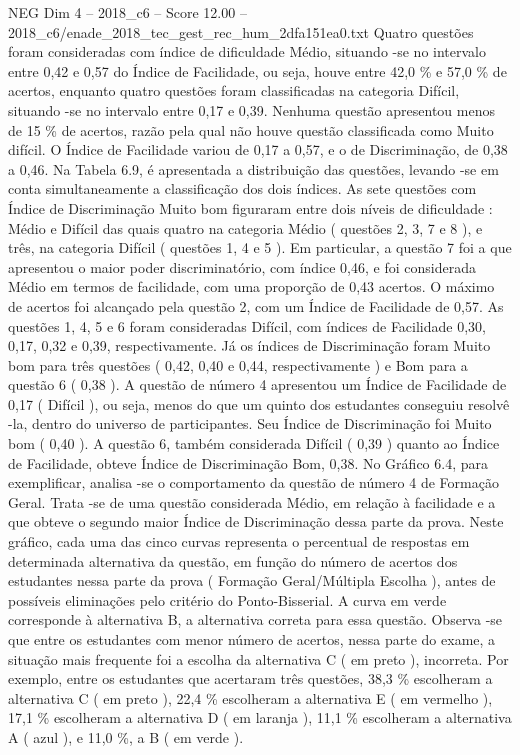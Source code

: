 \begin{textsample}{NEG Dim 4 – 2018\_c6 – Score 12.00 – 2018\_c6/enade\_2018\_tec\_gest\_rec\_hum\_2dfa151ea0.txt}
Quatro questões foram consideradas com índice de dificuldade Médio, situando -se no intervalo entre 0,42 e 0,57 do Índice de Facilidade, ou seja, houve entre 42,0 \% e 57,0 \% de acertos, enquanto quatro questões foram classificadas na categoria Difícil, situando -se no intervalo entre 0,17 e 0,39.
Nenhuma questão apresentou menos de 15 \% de acertos, razão pela qual não houve questão classificada como Muito difícil.
O Índice de Facilidade variou de 0,17 a 0,57, e o de Discriminação, de 0,38 a 0,46.
Na Tabela 6.9, é apresentada a distribuição das questões, levando -se em conta simultaneamente a classificação dos dois índices.
As sete questões com Índice de Discriminação Muito bom figuraram entre dois níveis de dificuldade : Médio e Difícil das quais quatro na categoria Médio ( questões 2, 3, 7 e 8 ), e três, na categoria Difícil ( questões 1, 4 e 5 ).
Em particular, a questão 7 foi a que apresentou o maior poder discriminatório, com índice 0,46, e foi considerada Médio em termos de facilidade, com uma proporção de 0,43 acertos.
O máximo de acertos foi alcançado pela questão 2, com um Índice de Facilidade de 0,57.
As questões 1, 4, 5 e 6 foram consideradas Difícil, com índices de Facilidade 0,30, 0,17, 0,32 e 0,39, respectivamente.
Já os índices de Discriminação foram Muito bom para três questões ( 0,42, 0,40 e 0,44, respectivamente ) e Bom para a questão 6 ( 0,38 ).
A questão de número 4 apresentou um Índice de Facilidade de 0,17 ( Difícil ), ou seja, menos do que um quinto dos estudantes conseguiu resolvê -la, dentro do universo de participantes.
Seu Índice de Discriminação foi Muito bom ( 0,40 ).
A questão 6, também considerada Difícil ( 0,39 ) quanto ao Índice de Facilidade, obteve Índice de Discriminação Bom, 0,38.
No Gráfico 6.4, para exemplificar, analisa -se o comportamento da questão de número 4 de Formação Geral.
Trata -se de uma questão considerada Médio, em relação à facilidade e a que obteve o segundo maior Índice de Discriminação dessa parte da prova.
Neste gráfico, cada uma das cinco curvas representa o percentual de respostas em determinada alternativa da questão, em função do número de acertos dos estudantes nessa parte da prova ( Formação Geral/Múltipla Escolha ), antes de possíveis eliminações pelo critério do Ponto-Bisserial.
A curva em verde corresponde à alternativa B, a alternativa correta para essa questão.
Observa -se que entre os estudantes com menor número de acertos, nessa parte do exame, a situação mais frequente foi a escolha da alternativa C ( em preto ), incorreta.
Por exemplo, entre os estudantes que acertaram três questões, 38,3 \% escolheram a alternativa C ( em preto ), 22,4 \% escolheram a alternativa E ( em vermelho ), 17,1 \% escolheram a alternativa D ( em laranja ), 11,1 \% escolheram a alternativa A ( azul ), e 11,0 \%, a B ( em verde ).

\end{textsample}
